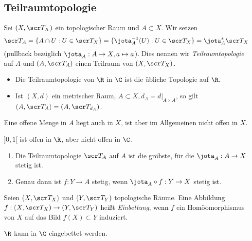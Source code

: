 \subsection{Teilraumtopologie}

\begin{df}
	Sei $(X, \scr T_X)$ ein topologischer Raum und $A \subset X$.
	Wir setzen
	\[
		\scr T_A = \{ A \cap U : U \in \scr T_X \}
		= \{ \jota_A^{-1}(U) : U \in \scr T_X \}
		= \jota_A^* \scr T_X
	\]
	(pullback bezüglich $\jota_A : A \to X, a \mapsto a$).
	Dies nennen wir \emph{Teilraumtopologie} auf $A$ und $(A, \scr T_A)$ einen Teilraum von $(X, \scr T_X)$.
\end{df}

\begin{ex}
	\begin{itemize}
		\item
			Die Teilraumtopologie von $\R$ in $\C$ ist die übliche Topologie auf $\R$.
		\item
			Ist $(X, d)$ ein metrischer Raum, $A \subset X, d_A = d|_{A\times A}$, so gilt $(A, \scr T_A) = (A, \scr T_{d_A})$.
	\end{itemize}
\end{ex}

\begin{nt}
	Eine offene Menge in $A$ liegt auch in $X$, ist aber im Allgemeinen nicht offen in $X$.

	$]0,1[$ ist offen in $\R$, aber nicht offen in $\C$.
\end{nt}

\begin{st}
	\begin{enumerate}[(1)]
		\item
			Die Teilraumtopologie $\scr T_A$ auf $A$ ist die gröbste, für die $\jota_A : A \to X$ stetig ist.
		\item
			Genau dann ist $f: Y \to A$ stetig, wenn $\jota_A \circ f: Y \to X$ stetig ist.
	\end{enumerate}
\end{st}

\begin{df}
	Seien $(X,\scr T_X)$ und $(Y, \scr T_Y)$ topologische Räume.
	Eine Abbildung $f: (X, \scr T_X) \to (Y, \scr T_Y)$ heißt \emph{Einbettung}, wenn $f$ ein Homöomorphismus von $X$ auf das Bild $f(X) \subset Y$ induziert.
\end{df}

\begin{ex}
	$\R$ kann in $\C$ eingebettet werden.
\end{ex}

